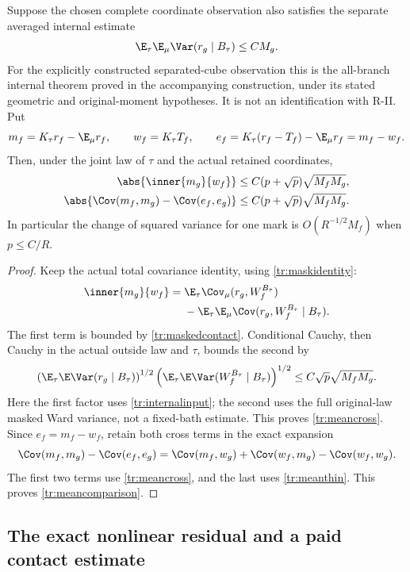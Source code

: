 \begin{corollary}
\label{tr:cross}
Suppose the chosen complete coordinate observation also satisfies the
separate averaged internal estimate
\begin{equation}
 \E_\tau\E_\mu\Var(r_g\mid B_\tau)\le C M_g.
 \label{tr:internalinput}
\end{equation}
For the explicitly constructed separated-cube observation this is the
all-branch internal theorem proved in the accompanying construction, under
its stated geometric and original-moment hypotheses. It is not an
identification with R-II. Put
\[
 m_f=K_\tau r_f-\E_\mu r_f,\qquad
 w_f=K_\tau T_f,\qquad
 e_f=K_\tau(r_f-T_f)-\E_\mu r_f=m_f-w_f.
\]
Then, under the joint law of \(\tau\) and the actual retained coordinates,
\begin{align}
 \abs{\inner{m_g}{w_f}}
   &\le C(p+\sqrt p)\sqrt{M_fM_g},
 \label{tr:meancross}\\
 \abs{\Cov(m_f,m_g)-\Cov(e_f,e_g)}
   &\le C(p+\sqrt p)\sqrt{M_fM_g}.
 \label{tr:meancomparison}
\end{align}
In particular the change of squared variance for one mark is
\(O(R^{-1/2}M_f)\) when \(p\le C/R\).
\end{corollary}

\begin{proof}
Keep the actual total covariance identity, using
\eqref{tr:maskidentity}:
\begin{align*}
 \inner{m_g}{w_f}
 ={}&\E_\tau\Cov_\mu(r_g,W_f^{B_\tau})\\
    &-\E_\tau\E_\mu\Cov(r_g,W_f^{B_\tau}\mid B_\tau).
\end{align*}
The first term is bounded by \eqref{tr:maskedcontact}. Conditional Cauchy,
then Cauchy in the actual outside law and \(\tau\), bounds the second by
\[
 \left(\E_\tau\E\Var(r_g\mid B_\tau)\right)^{1/2}
 \left(\E_\tau\E\Var(W_f^{B_\tau}\mid B_\tau)\right)^{1/2}
 \le C\sqrt p\sqrt{M_fM_g}.
\]
Here the first factor uses \eqref{tr:internalinput}; the second uses the
full original-law masked Ward variance, not a fixed-bath estimate.
This proves \eqref{tr:meancross}. Since \(e_f=m_f-w_f\), retain both
cross terms in the exact expansion
\[
 \Cov(m_f,m_g)-\Cov(e_f,e_g)
 =\Cov(m_f,w_g)+\Cov(w_f,m_g)-\Cov(w_f,w_g).
\]
The first two terms use \eqref{tr:meancross}, and the last uses
\eqref{tr:meanthin}. This proves \eqref{tr:meancomparison}.
\end{proof}

\subsection{The exact nonlinear residual and a paid contact estimate}

